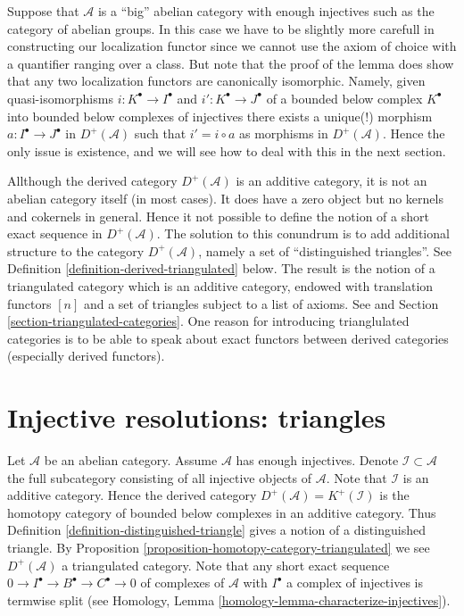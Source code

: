 \begin{remark}
\label{remark-big-localization}
Suppose that $\mathcal{A}$ is a ``big'' abelian category with enough injectives
such as the category of abelian groups. In this case we have to be slightly
more carefull in constructing our localization functor since we cannot use
the axiom of choice with a quantifier ranging over a class. But note that
the proof of the lemma does show that any two localization functors are
canonically isomorphic. Namely, given quasi-isomorphisms
$i : K^\bullet \to I^\bullet$ and $i' : K^\bullet \to J^\bullet$ of
a bounded below complex $K^\bullet$ into bounded below complexes of injectives
there exists a unique(!) morphism $a : I^\bullet \to J^\bullet$
in $D^{+}(\mathcal{A})$ such that $i' = i \circ a$ as morphisms in
$D^{+}(\mathcal{A})$. Hence the only issue is existence, and we will see how
to deal with this in the next section.
\end{remark}

\begin{remark}
\label{remark-failure}
Allthough the derived category $D^{+}(\mathcal{A})$ is an additive category,
it is not an abelian category itself (in most cases). It does have a zero
object but no kernels and cokernels in general. Hence it not possible to define
the notion of a short exact sequence in $D^{+}(\mathcal{A})$. The solution to
this conundrum is to add additional structure to the category
$D^{+}(\mathcal{A})$, namely a set of ``distinguished triangles''.
See Definition \ref{definition-derived-triangulated} below.
The result is the notion of a triangulated category which is an
additive category, endowed with translation functors $[n]$
and a set of triangles subject to a list of axioms.
See \cite{Verdier} and Section \ref{section-triangulated-categories}.
One reason for introducing trianglulated categories is to be able to speak
about exact functors between derived categories (especially derived
functors).
\end{remark}






\section{Injective resolutions: triangles}
\label{section-derived-triangulated}

\noindent
Let $\mathcal{A}$ be an abelian category.
Assume $\mathcal{A}$ has enough injectives.
Denote $\mathcal{I} \subset \mathcal{A}$ the full subcategory consisting
of all injective objects of $\mathcal{A}$. Note that $\mathcal{I}$
is an additive category. Hence the derived category
$D^{+}(\mathcal{A}) = K^{+}(\mathcal{I})$ is the
homotopy category of bounded below complexes in an additive category.
Thus Definition \ref{definition-distinguished-triangle}
gives a notion of a distinguished triangle. By
Proposition \ref{proposition-homotopy-category-triangulated}
we see $D^{+}(\mathcal{A})$ a triangulated category.
Note that any short exact sequence
$0 \to I^\bullet \to B^\bullet \to C^\bullet \to 0$
of complexes of $\mathcal{A}$ with $I^\bullet$ a complex of injectives
is termwise split (see
Homology, Lemma \ref{homology-lemma-characterize-injectives}).

